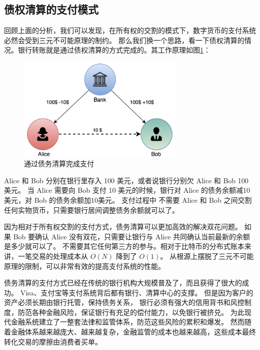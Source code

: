 %

\subsection{债权清算的支付模式}
回顾上面的分析，我们可以发现，在所有权的交割的模式下，数字货币的支付系统必然会受到三元不可能原理的制约。
那么我们换一个思路，看一下债权清算的情况。银行转账就是通过债权清算的方式完成的。其工作原理如图\ref{fig:clearing}：

\begin{figure}[h!]
    \centering
    \includegraphics[width=8cm, keepaspectratio]{../images/clearing.png}
    \caption{通过债务清算完成支付}
    \label{fig:clearing}
\end{figure}

Alice 和 Bob 分别在银行里存入 100 美元，或者说银行分别欠 Alice 和 Bob 100 美元。
当 Alice 需要向 Bob 支付 10 美元的时候，银行对 Alice 的债务余额减10美元，对 Bob 的债务余额加10美元。
支付过程中 不需要 Alice 和 Bob 之间交割任何实物货币，只需要银行居间调整债务余额就可以了。

因为相对于所有权交割的支付方式，债务清算可以更加高效的解决双花问题。
如果 Bob 要确认 Alice 没有双花，只需要让银行与 Alice 共同确认当前最新的余额是多少就可以了。
不需要其它任何第三方的参与。相对于比特币的分布式账本来讲，一笔交易的处理成本从 $O(N)$ 降到了 $O(1)$。
从根源上摆脱了三元不可能原理的限制，可以非常有效的提高支付系统的性能。

债务清算的支付方式已经在传统的银行机构大规模普及了，而且获得了很大的成功。
Visa、支付宝等支付系统背后都有银行、清算中心的支撑。
但是因为客户的资产必须长期由银行托管，保持债务关系，
银行必须有强大的信用背书和风控制度，防范各种金融风险，保证银行有充足的偿付能力，以免银行被挤兑。
为此现代金融系统建立了一整套法律和监管体系，防范这些风险的累积和爆发。
然而随着金融体系越来越庞大、越来越复杂，金融监管的成本也越来越高，这些成本最终转化交易的摩擦由消费者买单。

